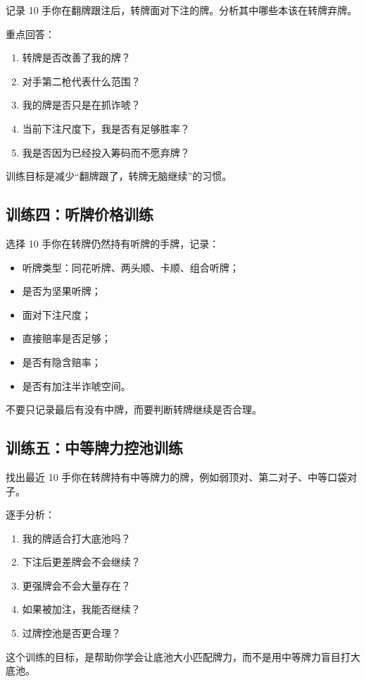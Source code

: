 记录 10 手你在翻牌跟注后，转牌面对下注的牌。分析其中哪些本该在转牌弃牌。

重点回答：

\begin{enumerate}
\item 转牌是否改善了我的牌？
\item 对手第二枪代表什么范围？
\item 我的牌是否只是在抓诈唬？
\item 当前下注尺度下，我是否有足够胜率？
\item 我是否因为已经投入筹码而不愿弃牌？
\end{enumerate}

训练目标是减少“翻牌跟了，转牌无脑继续”的习惯。

\subsection*{训练四：听牌价格训练}

选择 10 手你在转牌仍然持有听牌的手牌，记录：

\begin{itemize}
\item 听牌类型：同花听牌、两头顺、卡顺、组合听牌；
\item 是否为坚果听牌；
\item 面对下注尺度；
\item 直接赔率是否足够；
\item 是否有隐含赔率；
\item 是否有加注半诈唬空间。
\end{itemize}

不要只记录最后有没有中牌，而要判断转牌继续是否合理。

\subsection*{训练五：中等牌力控池训练}

找出最近 10 手你在转牌持有中等牌力的牌，例如弱顶对、第二对子、中等口袋对子。

逐手分析：

\begin{enumerate}
\item 我的牌适合打大底池吗？
\item 下注后更差牌会不会继续？
\item 更强牌会不会大量存在？
\item 如果被加注，我能否继续？
\item 过牌控池是否更合理？
\end{enumerate}

这个训练的目标，是帮助你学会让底池大小匹配牌力，而不是用中等牌力盲目打大底池。
